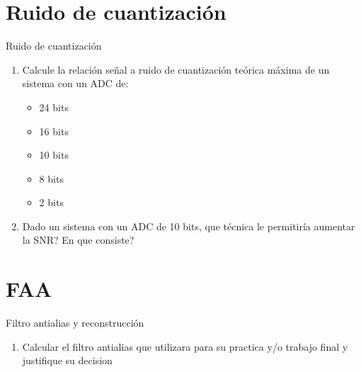  \section{Ruido de cuantización}
 \begin{frame}{Ruido de cuantización}
    \begin{enumerate}
       \item{Calcule la relación señal a ruido de cuantización teórica máxima de un sistema con un ADC de:}
          \begin{itemize}
             \item{24 bits}
             \item{16 bits}
             \item{10 bits}
             \item{ 8 bits}
             \item{ 2 bits}
          \end{itemize}
       \item{Dado un sistema con un ADC de 10 bits, que técnica le permitiría aumentar la SNR? En que consiste?}
    \end{enumerate}
 \end{frame}
 \section{FAA}
 \begin{frame}{Filtro antialias y reconstrucción}
    \begin{enumerate}
       \item{Calcular el filtro antialias que utilizara para su practica y/o trabajo final y justifique su decision}
    \end{enumerate}
 \end{frame}
